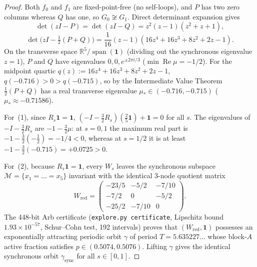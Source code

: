 \documentclass[11pt]{article}
\theoremstyle{plain}
\theoremstyle{definition}
\theoremstyle{remark}
\DeclareMathOperator{\spn}{span}
\begin{document}
\begin{proof}
Both $f_0$ and $f_1$ are fixed-point-free (no self-loops), and $P$ has two zero columns whereas $Q$ has one, so $G_0 \not\cong G_1$. Direct determinant expansion gives
\[
\det(zI - P) = \det(zI - Q) = z^2(z - 1)(z^2 + z + 1),
\]
\[
\det\bigl(zI - \tfrac{1}{2}(P + Q)\bigr) = \frac{1}{16}(z - 1)(16z^4 + 16z^3 + 8z^2 + 2z - 1).
\]
On the transverse space $\mathbb{R}^5 / \spn(\mathbf{1})$ (dividing out the synchronous eigenvalue $z = 1$), $P$ and $Q$ have eigenvalues $0, 0, e^{\pm 2\pi i/3}$ ($\min \operatorname{Re}\mu = -1/2$). For the midpoint quartic $q(z) := 16z^4 + 16z^3 + 8z^2 + 2z - 1$, $q(-0.716) > 0 > q(-0.715)$, so by the Intermediate Value Theorem $\frac{1}{2}(P+Q)$ has a real transverse eigenvalue $\mu_* \in (-0.716, -0.715)$ ($\mu_* \approx -0.71586$).

For~(1), since $R_s \mathbf{1} = \mathbf{1}$, $(-I - \frac{3}{2} R_s)(\frac{2}{5}\mathbf{1}) + \mathbf{1} = 0$ for all $s$. The eigenvalues of $-I - \frac{3}{2} R_s$ are $-1 - \frac{3}{2}\mu$: at $s = 0, 1$ the maximum real part is $-1 - \frac{3}{2}(-\frac{1}{2}) = -1/4 < 0$, whereas at $s = 1/2$ it is at least $-1 - \frac{3}{2}(-0.715) = +0.0725 > 0$.

For~(2), because $R_s \mathbf{1} = \mathbf{1}$, every $W_s$ leaves the synchronous subspace $\mathcal{M} = \{x_1 = \dots = x_5\}$ invariant with the identical 3-node quotient matrix
\[
W_{\mathrm{red}} = \begin{pmatrix} -23/5 & -5/2 & -7/10 \\ -7/2 & 0 & -5/2 \\ -25/2 & -7/10 & 0 \end{pmatrix}.
\]
The 448-bit Arb certificate (\texttt{explore.py certificate}, Lipschitz bound $1.93 \times 10^{-57}$, Schur--Cohn test, 192 intervals) proves that $(W_{\mathrm{red}}, \mathbf{1})$ possesses an exponentially attracting periodic orbit $\gamma$ of period $T = 5.635227\dots$ whose block-$A$ active fraction satisfies $p \in (0.5074, 0.5076)$. Lifting $\gamma$ gives the identical synchronous orbit $\gamma_{\mathrm{sync}}$ for all $s \in [0, 1]$.


\end{proof}
\end{document}

